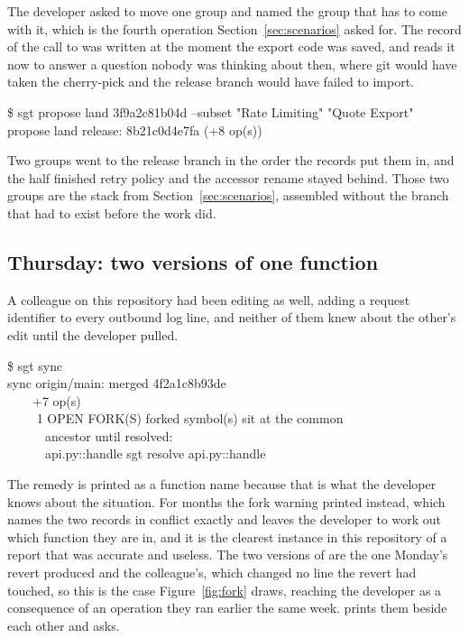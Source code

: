 \noindent
The developer asked to move one group and \sgt{} named the group that has to come
with it, which is the fourth operation Section~\ref{sec:scenarios} asked for. The
record of the call to  was written at the moment the export code
was saved, and \sgt{} reads it now to answer a question nobody was thinking about
then, where git would have taken the cherry-pick and the release branch would have
failed to import.

\begin{out}
\$ sgt propose land 3f9a2c81b04d --subset "Rate Limiting" "Quote Export"\\
\ttok{} propose land release: 8b21c0d4e7fa (+8 op(s))
\end{out}

\noindent
Two groups went to the release branch in the order the records put them in, and the
half finished retry policy and the accessor rename stayed behind. Those two groups
are the stack from Section~\ref{sec:scenarios}, assembled without the branch that
had to exist before the work did.

\subsection{Thursday: two versions of one function}

A colleague on this repository had been editing  as well,
adding a request identifier to every outbound log line, and neither of them knew
about the other's edit until the developer pulled.

\begin{out}
\$ sgt sync\\
\ttwarn{} sync origin/main: merged 4f2a1c8b93de\\
~~~~+7 op(s)\\
~~~~\ttwarn{} 1 OPEN FORK(S) \ttdash{} forked symbol(s) sit at the common\\
~~~~~~ancestor until resolved:\\
~~~~~~api.py::handle \ttarrow{} sgt resolve api.py::handle
\end{out}

\noindent
The remedy is printed as a function name because that is what the developer knows
about the situation. For months the fork warning printed
 instead, which names the two records
in conflict exactly and leaves the developer to work out which function they are in,
and it is the clearest instance in this repository of a report that was accurate and
useless. The two versions of  are the one Monday's
revert produced and the colleague's, which changed no line the revert had touched, so
this is the case Figure~\ref{fig:fork} draws, reaching the developer as a consequence
of an operation they ran earlier the same week. \sgt{} prints them beside each other
and asks.


